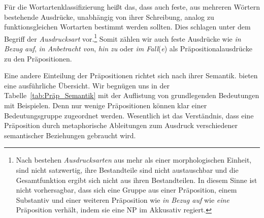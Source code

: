 Für die Wortartenklassifizierung heißt das, dass auch feste, aus mehreren Wörtern bestehende Ausdrücke, unabhängig von ihrer Schreibung, analog zu funktionsgleichen Wortarten bestimmt werden sollten. Dies schlagen \citet{Hennig_Buchwald2010} unter dem Begriff der \textit{Ausdrucksart} vor.\footnote{Nach \citet[13, 17]{Hennig_Buchwald2010} bestehen \textit{Ausdrucksarten} aus mehr als einer morphologischen Einheit, sind nicht satzwertig, ihre Bestandteile sind nicht austauschbar und die Gesamtfunktion ergibt sich nicht aus ihren Bestandteilen. In diesem Sinne ist nicht vorhersagbar, dass sich eine Gruppe aus einer Präposition, einem Substantiv und einer weiteren Präposition wie \textit{in Bezug auf} wie \textit{eine} Präposition verhält, indem sie eine NP im Akkusativ regiert.} Somit zählen wir auch feste Ausdrücke wie \textit{in Bezug auf}, \textit{in Anbetracht von}, \textit{hin zu} oder \textit{im Fall}(\textit{e}) als Präpositionalausdrücke zu den Präpositionen.

Eine andere Einteilung der Präpositionen richtet sich nach ihrer Semantik. \citet[361--390]{HelbigBuscha} bieten eine ausführliche Übersicht. Wir begnügen uns in der Tabelle~\ref{tab:Präp_Semantik} mit der Auflistung von grundlegenden Bedeutungen mit Beispielen. Denn nur wenige Präpositionen können klar einer Bedeutungsgruppe zugeordnet werden. Wesentlich ist das Verständnis, dass eine Präposition durch metaphorische Ableitungen zum Ausdruck verschiedener semantischer Beziehungen gebraucht wird. 

